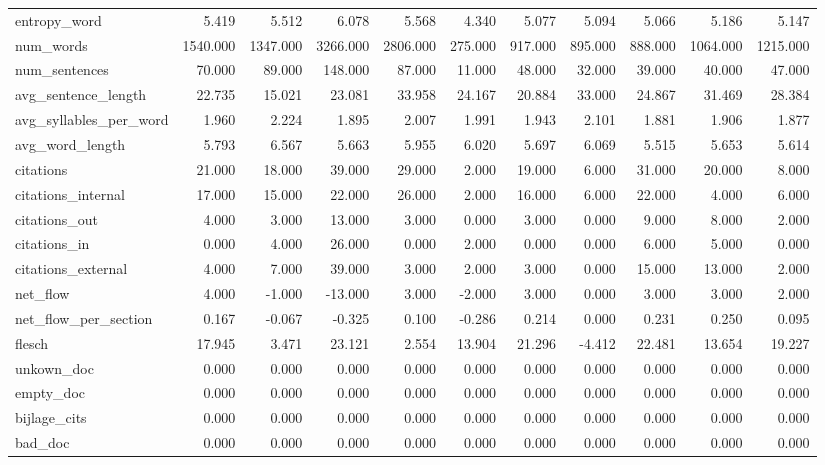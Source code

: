 \begin{tabular}{lrrrrrrrrrr}
\cline{1-11}
entropy\_word & 5.419 & 5.512 & 6.078 & 5.568 & 4.340 & 5.077 & 5.094 & 5.066 & 5.186 & 5.147 \\
\cline{1-11}
num\_words & 1540.000 & 1347.000 & 3266.000 & 2806.000 & 275.000 & 917.000 & 895.000 & 888.000 & 1064.000 & 1215.000 \\
\cline{1-11}
num\_sentences & 70.000 & 89.000 & 148.000 & 87.000 & 11.000 & 48.000 & 32.000 & 39.000 & 40.000 & 47.000 \\
\cline{1-11}
avg\_sentence\_length & 22.735 & 15.021 & 23.081 & 33.958 & 24.167 & 20.884 & 33.000 & 24.867 & 31.469 & 28.384 \\
\cline{1-11}
avg\_syllables\_per\_word & 1.960 & 2.224 & 1.895 & 2.007 & 1.991 & 1.943 & 2.101 & 1.881 & 1.906 & 1.877 \\
\cline{1-11}
avg\_word\_length & 5.793 & 6.567 & 5.663 & 5.955 & 6.020 & 5.697 & 6.069 & 5.515 & 5.653 & 5.614 \\
\cline{1-11}
citations & 21.000 & 18.000 & 39.000 & 29.000 & 2.000 & 19.000 & 6.000 & 31.000 & 20.000 & 8.000 \\
\cline{1-11}
citations\_internal & 17.000 & 15.000 & 22.000 & 26.000 & 2.000 & 16.000 & 6.000 & 22.000 & 4.000 & 6.000 \\
\cline{1-11}
citations\_out & 4.000 & 3.000 & 13.000 & 3.000 & 0.000 & 3.000 & 0.000 & 9.000 & 8.000 & 2.000 \\
\cline{1-11}
citations\_in & 0.000 & 4.000 & 26.000 & 0.000 & 2.000 & 0.000 & 0.000 & 6.000 & 5.000 & 0.000 \\
\cline{1-11}
citations\_external & 4.000 & 7.000 & 39.000 & 3.000 & 2.000 & 3.000 & 0.000 & 15.000 & 13.000 & 2.000 \\
\cline{1-11}
net\_flow & 4.000 & -1.000 & -13.000 & 3.000 & -2.000 & 3.000 & 0.000 & 3.000 & 3.000 & 2.000 \\
\cline{1-11}
net\_flow\_per\_section & 0.167 & -0.067 & -0.325 & 0.100 & -0.286 & 0.214 & 0.000 & 0.231 & 0.250 & 0.095 \\
\cline{1-11}
flesch & 17.945 & 3.471 & 23.121 & 2.554 & 13.904 & 21.296 & -4.412 & 22.481 & 13.654 & 19.227 \\
\cline{1-11}
unkown\_doc & 0.000 & 0.000 & 0.000 & 0.000 & 0.000 & 0.000 & 0.000 & 0.000 & 0.000 & 0.000 \\
\cline{1-11}
empty\_doc & 0.000 & 0.000 & 0.000 & 0.000 & 0.000 & 0.000 & 0.000 & 0.000 & 0.000 & 0.000 \\
\cline{1-11}
bijlage\_cits & 0.000 & 0.000 & 0.000 & 0.000 & 0.000 & 0.000 & 0.000 & 0.000 & 0.000 & 0.000 \\
\cline{1-11}
bad\_doc & 0.000 & 0.000 & 0.000 & 0.000 & 0.000 & 0.000 & 0.000 & 0.000 & 0.000 & 0.000 \\
\cline{1-11}
\bottomrule
\end{tabular}
